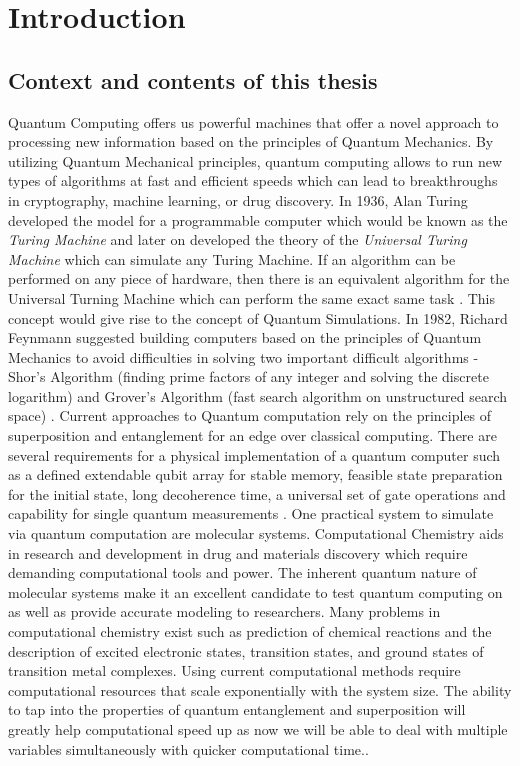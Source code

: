 \chapter{Introduction}
\label{chapter:Introduction}
\thispagestyle{myheadings}

\section{Context and contents of this thesis}
\label{sec:history}

\indent Quantum Computing offers us powerful machines that offer a novel approach to processing new information based on the principles of Quantum Mechanics. By utilizing Quantum Mechanical principles, quantum computing allows to run new types of algorithms at fast and efficient speeds which can lead to breakthroughs in cryptography, machine learning, or drug discovery. In 1936, Alan Turing developed the model for a programmable computer which would be known as the \textit{Turing Machine} and later on developed the theory of the \textit{Universal Turing Machine} which can simulate any Turing Machine. If an algorithm can be performed on any piece of hardware, then there is an equivalent algorithm for the Universal Turning Machine which can perform the same exact same task 
\cite{PLMS:PLMS0230}.
This concept would give rise to the concept of Quantum Simulations. In 1982, Richard Feynmann suggested building computers based on the principles of Quantum Mechanics to avoid difficulties in solving two important difficult algorithms - Shor's Algorithm (finding prime factors of any integer and solving the discrete logarithm) and Grover's Algorithm (fast search algorithm on unstructured search space) 
\cite{Feynman1982}. \newline
\indent Current approaches to Quantum computation rely on the principles of superposition and entanglement for an edge over classical computing. There are several requirements for a physical implementation of a quantum computer such as a defined extendable qubit array for stable memory, feasible state preparation for the initial state, long decoherence time, a universal set of gate operations and capability for single quantum measurements \cite{Nielsen:2011:QCQ:1972505}. \newline
\indent One practical system to simulate via quantum computation are molecular systems.
Computational Chemistry aids in research and development in drug and materials discovery which require demanding computational tools and power. The inherent quantum nature of molecular systems make it an excellent candidate to test quantum computing on as well as provide accurate modeling to researchers. Many problems in computational chemistry exist such as prediction of chemical reactions and the description of excited electronic states, transition states, and ground states of transition metal complexes. Using current computational methods require computational resources that scale exponentially with the system size. The ability to tap into the properties of quantum entanglement and superposition will greatly help computational speed up as now we will be able to deal with multiple variables simultaneously with quicker computational time.\cite{aspuru-guzik_photonic_2012}. \newline
